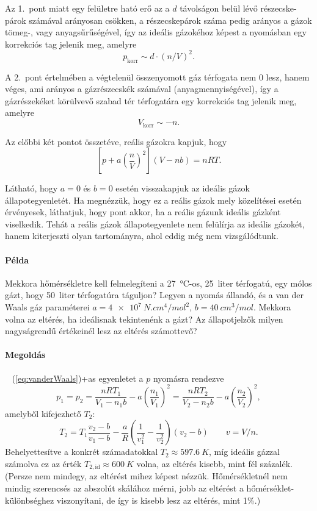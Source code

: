 \documentclass[12pt,a4paper]{scrartcl}
\begin{document}
Az 1.\ pont miatt egy felületre ható erő az a $d$ távolságon belül lévő részecske-párok számával arányosan csökken, a részecskepárok száma pedig arányos a gázok tömeg-, vagy anyagsűrűségével, így az ideális gázokéhoz képest a nyomásban egy korrekciós tag jelenik meg, amelyre
\[{p_{{\text{korr}}}} \sim d \cdot {\left( {n/V} \right)^2}.\]

A 2.\ pont értelmében a végtelenül összenyomott gáz térfogata nem 0 lesz, hanem véges, ami arányos a gázrészecskék számával (anyagmennyiségével), így a gázrészekéket körülvevő szabad tér térfogatára egy korrekciós tag jelenik meg, amelyre
\[{V_{{\text{korr}}}} \sim -n.\]

Az előbbi két pontot összetéve, reális gázokra kapjuk, hogy
\begin{equation} \label{eq:vanderWaals}
\left[ {p + a{{\left( {\frac{n}{V}} \right)}^2}} \right]\left( {V - nb} \right) = nRT.
\end{equation}

Látható, hogy $a=0$ és $b=0$ esetén visszakapjuk az ideális gázok állapotegyenletét. Ha megnézzük, hogy ez a reális gázok mely közelítései esetén érvényesek, láthatjuk, hogy pont akkor, ha a reális gázunk ideális gázként viselkedik. Tehát a reális gázok állapotegyenlete nem felülírja az ideális gázokét, hanem kiterjeszti olyan tartományra, ahol eddig még nem vizsgálódtunk.
\paragraph{Példa} Mekkora hőmérsékletre kell felmelegíteni a \SI{27}{\degreeCelsius}-os, \SI{25}{liter} térfogatú, egy mólos gázt, hogy \SI{50}{liter} térfogatúra táguljon? Legyen a nyomás állandó, és a van der Waals gáz paraméterei $a=\SI{4e7}{N.cm^4/mol^2}$, $b=\SI{40}{cm^3/mol}$. Mekkora volna az eltérés, ha ideálisnak tekintenénk a gázt? Az állapotjelzők milyen nagyságrendű értékeinél lesz az eltérés számottevő?
\paragraph{Megoldás}~
\Atold(\ref{eq:vanderWaals})+as{} egyenletet a $p$ nyomásra rendezve
\[{p_1} = {p_2} = \frac{{nR{T_1}}}{{{V_1} - {n_1}b}} - a{\left( {\frac{{{n_1}}}{{{V_1}}}} \right)^2} = \frac{{nR{T_2}}}{{{V_2} - {n_2}b}} - a{\left( {\frac{{{n_2}}}{{{V_2}}}} \right)^2},\]
amelyből kifejezhető $T_2$:
\[{T_2} = {T_1}\frac{{{v_2} - b}}{{{v_1} - b}} - \frac{a}{R}\left( {\frac{1}{{v_1^2}} - \frac{1}{{v_2^2}}} \right)\left( {{v_2} - b} \right)\quad \quad v = V/n.\]
Behelyettesítve a konkrét számadatokkal $T_2 \approx \SI{597.6}{K}$, míg ideális gázzal számolva ez az érték $T_{2,\text{id}} \approx \SI{600}{K}$ volna, az eltérés kisebb, mint fél százalék. (Persze nem mindegy, az eltérést mihez képest nézzük. Hőmérsékletnél nem mindig szerencsés az abszolút skálához mérni, jobb az eltérést a hőmérséklet-különbséghez viszonyítani, de így is kisebb lesz az eltérés, mint 1\%.)
\end{document}

